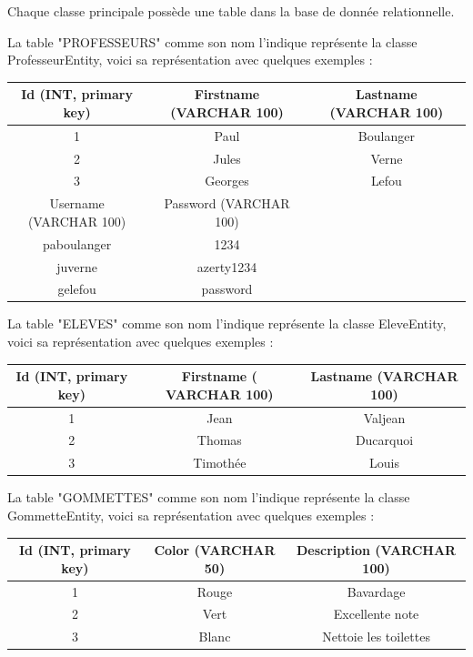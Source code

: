 \documentclass[11pt]{article}
\begin{document}
Chaque classe principale possède une table dans la base de donnée relationnelle. 

La table "PROFESSEURS" comme son nom l'indique représente la classe ProfesseurEntity,
voici sa représentation avec quelques exemples :

\begin{center}
\begin{tabular}{|c|c|c|}
\hline
Id (INT, primary key) & Firstname (VARCHAR 100) & Lastname (VARCHAR 100)\\
\hline
1 & Paul & Boulanger\\
2 & Jules & Verne\\
3 & Georges & Lefou\\
\hline
Username (VARCHAR 100) & Password (VARCHAR 100) & \\
\hline
paboulanger & 1234 & \\
juverne & azerty1234 & \\
gelefou & password & \\
\hline
\end{tabular}
\end{center}

La table "ELEVES" comme son nom l'indique représente la classe EleveEntity,
voici sa représentation avec quelques exemples :

\begin{center}
\begin{tabular}{|c|c|c|}
\hline
Id (INT, primary key) & Firstname ( VARCHAR 100) & Lastname (VARCHAR 100)\\
\hline
1 & Jean & Valjean\\
2 & Thomas & Ducarquoi\\
3 & Timothée & Louis\\
\hline
\end{tabular}
\end{center}

La table "GOMMETTES" comme son nom l'indique représente la classe GommetteEntity,
voici sa représentation avec quelques exemples :

\begin{center}
\begin{tabular}{|c|c|c|}
\hline
Id (INT, primary key) & Color (VARCHAR 50) & Description (VARCHAR 100)\\
\hline
1 & Rouge & Bavardage\\
2 & Vert & Excellente note\\
3 & Blanc & Nettoie les toilettes\\
\hline
\end{tabular}
\end{center}
\end{document}
